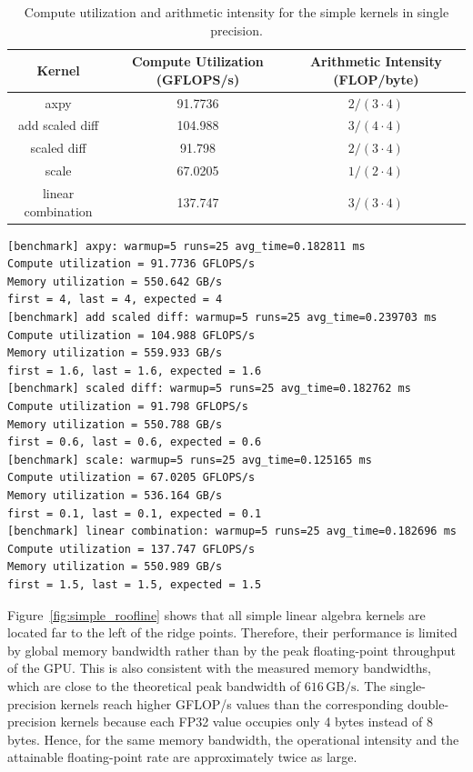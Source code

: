 \documentclass[unicode,10pt,a4paper,oneside,numbers=endperiod,openany]{scrartcl}
\begin{document}
\begin{table}
\centering
\begin{tabular}{|c|c|c|}
\hline
Kernel & Compute Utilization (GFLOPS/s) & Arithmetic Intensity (FLOP/byte) \\
\hline
axpy & 91.7736 & $2/(3\cdot 4)$ \\
add scaled diff & 104.988 & $3/(4\cdot 4)$ \\
scaled diff & 91.798 & $2/(3\cdot 4)$ \\
scale & 67.0205 & $1/(2\cdot 4)$ \\
linear combination & 137.747 & $3/(3\cdot 4)$ \\
\hline
\end{tabular}
\caption{Compute utilization and arithmetic intensity for the simple kernels in single precision.}
\label{tab: simple_kernels_float}
\end{table}

\begin{lstlisting}[style=grayverbatim,caption={Output of the simple kernels for the float format.},language=bash,label={lst:simple_kernels_float}]
[benchmark] axpy: warmup=5 runs=25 avg_time=0.182811 ms
Compute utilization = 91.7736 GFLOPS/s
Memory utilization = 550.642 GB/s
first = 4, last = 4, expected = 4
[benchmark] add scaled diff: warmup=5 runs=25 avg_time=0.239703 ms
Compute utilization = 104.988 GFLOPS/s
Memory utilization = 559.933 GB/s
first = 1.6, last = 1.6, expected = 1.6
[benchmark] scaled diff: warmup=5 runs=25 avg_time=0.182762 ms
Compute utilization = 91.798 GFLOPS/s
Memory utilization = 550.788 GB/s
first = 0.6, last = 0.6, expected = 0.6
[benchmark] scale: warmup=5 runs=25 avg_time=0.125165 ms
Compute utilization = 67.0205 GFLOPS/s
Memory utilization = 536.164 GB/s
first = 0.1, last = 0.1, expected = 0.1
[benchmark] linear combination: warmup=5 runs=25 avg_time=0.182696 ms
Compute utilization = 137.747 GFLOPS/s
Memory utilization = 550.989 GB/s
first = 1.5, last = 1.5, expected = 1.5
\end{lstlisting}

Figure~\ref{fig:simple_roofline} shows that all simple linear algebra kernels are
located far to the left of the ridge points. Therefore, their performance is
limited by global memory bandwidth rather than by the peak floating-point
throughput of the GPU. This is also consistent with the measured memory
bandwidths, which are close to the theoretical peak bandwidth of
\(616\,\mathrm{GB/s}\). The single-precision kernels reach higher GFLOP/s values
than the corresponding double-precision kernels because each FP32 value occupies
only 4 bytes instead of 8 bytes. Hence, for the same memory bandwidth, the
operational intensity and the attainable floating-point rate are approximately
twice as large.
\end{document}
